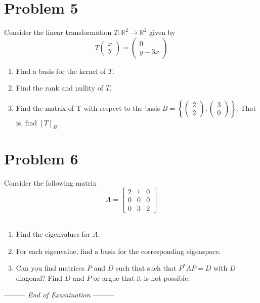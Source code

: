 \documentclass[a4paper,10pt]{article}
\newcommand{\lastwords}{End of Examination}
\def\R{\mathbb R}
\begin{document}
\newpage

\section*{Problem 5}
Consider the linear transformation $T: \R^2 \rightarrow \R^2$ given by
$$
	T\left( \begin{array}{c} x \\ y \end{array} \right) = \left( \begin{array}{c} 0 \\ y-3x \end{array} \right)
$$
\begin{enumerate}
\item Find a basis for the kernel of $T$.
\item Find the rank and nullity of $T$.
\item Find the matrix of T with respect to the basis $B=\left\{ \left( \begin{array}{c} 2 \\ 2 \end{array} \right), \left( \begin{array}{c} 3 \\ 0 \end{array} \right)  \right\}$.
That is, find $[T]_{B}$.
\end{enumerate}

\section*{Problem 6}
Consider the following matrix
$$
A=\left[ \begin{array}{ccc} 2 & 1 & 0 \\ 0 & 0 & 0 \\ 0 & 3 & 2 \end{array} \right]
$$ \\
\begin{enumerate}
\item Find the eigenvalues for $A$.
\item For each eigenvalue, find a basis for the corresponding eigenspace.
\item Can you find matrices $P$ and $D$ such that such that $P^*AP=D$ with $D$ diagonal? Find $D$ and $P$ or argue that it is not possible.
\end{enumerate}


\begin{center}
\vspace{3cm}
--------- \textit{\lastwords} ---------
\end{center}


\label{finalpage}
\end{document}

